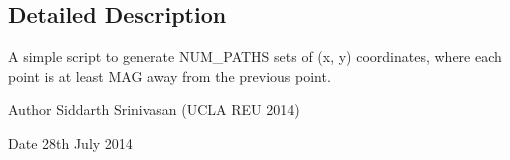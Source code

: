 \subsection{Detailed Description}
A simple script to generate N\+U\+M\+\_\+\+P\+A\+T\+H\+S sets of (x, y) coordinates, where each point is at least M\+A\+G away from the previous point. 

\begin{DoxyAuthor}{Author}
Siddarth Srinivasan (U\+C\+L\+A R\+E\+U 2014) 
\end{DoxyAuthor}
\begin{DoxyDate}{Date}
28th July 2014 
\end{DoxyDate}
